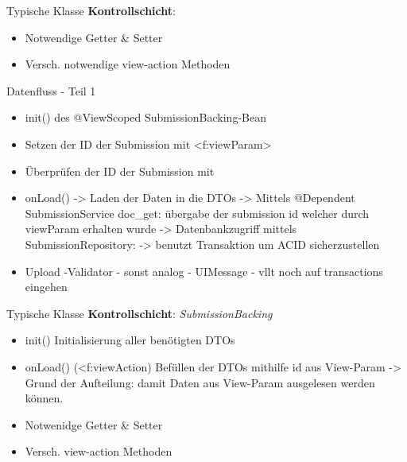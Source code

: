 \documentclass{beamer}
\begin{document}
\begin{frame}{Typische Klasse \textbf{Kontrollschicht}:}
\begin{itemize}
            \item Notwendige Getter & Setter %
            \item Versch. notwendige view-action Methoden %
        \end{itemize}
    \end{frame}


    \begin{frame}{Datenfluss - Teil 1}
        \begin{itemize}
            \item init() des @ViewScoped SubmissionBacking-Bean
            \item Setzen der ID der Submission mit <f:viewParam>
            \item Überprüfen der ID der Submission mit %
            \item onLoad()
            -> Laden der Daten in die DTOs
            -> Mittels @Dependent SubmissionService doc_get: übergabe der submission id
            welcher durch viewParam erhalten wurde
            -> Datenbankzugriff mittels SubmissionRepository:
            -> benutzt Transaktion um ACID sicherzustellen
            \item Upload
            -Validator
            - sonst analog
            - UIMessage
            - vllt noch auf transactions eingehen
        \end{itemize}
    \end{frame}

    \begin{frame}{Typische Klasse \textbf{Kontrollschicht}:}
        \emph{SubmissionBacking}
        \pause
        \begin{itemize}
            \item init()
            Initialisierung aller benötigten DTOs
            \item onLoad() (<f:viewAction)
            Befüllen der DTOs mithilfe id aus View-Param
            -> Grund der Aufteilung: damit Daten aus View-Param ausgelesen werden können.
            \item Notwenidge Getter & Setter %
            \item Versch. view-action Methoden
        \end{itemize}
    \end{frame}
\end{document}
